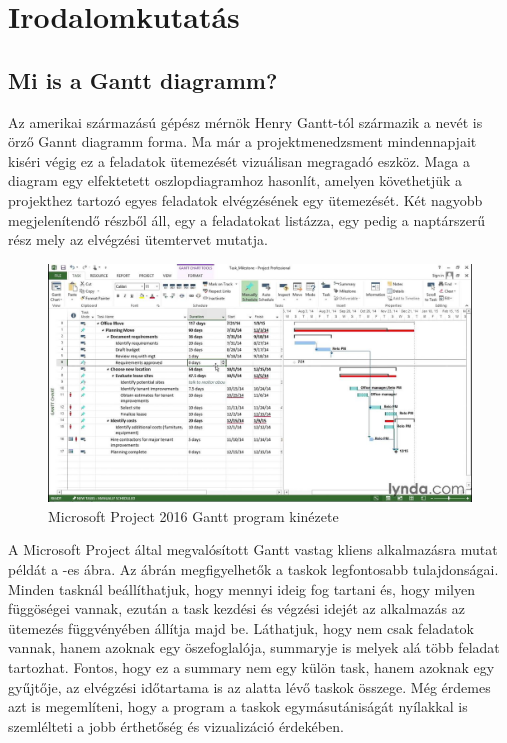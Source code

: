 \chapter{Irodalomkutatás}\label{sect:Literature}
\section{Mi is a Gantt diagramm?}

\hspace{2mm} Az amerikai származású gépész mérnök Henry Gantt-tól származik a nevét is örző Gannt diagramm forma. Ma már a projektmenedzsment mindennapjait kiséri végig ez a feladatok ütemezését vizuálisan megragadó eszköz. Maga a diagram egy elfektetett oszlopdiagramhoz hasonlít, amelyen követhetjük a projekthez tartozó egyes feladatok elvégzésének egy ütemezését.  Két nagyobb megjelenítendő részből áll, egy a feladatokat listázza, egy pedig a naptárszerű rész mely az elvégzési ütemtervet mutatja. 

\begin{figure}[!ht]
\centering
\includegraphics[width=\textwidth, keepaspectratio]{figures/msproject.jpg}
\caption{Microsoft Project 2016 Gantt program kinézete} 
\label{fig:MSProject}
\end{figure} 

A Microsoft Project által megvalósított Gantt vastag kliens alkalmazásra mutat példát a -es ábra. Az ábrán megfigyelhetők a taskok legfontosabb tulajdonságai. Minden tasknál beállíthatjuk, hogy mennyi ideig fog tartani és, hogy milyen függöségei vannak, ezután a task kezdési és végzési idejét az alkalmazás az ütemezés függvényében állítja majd be. Láthatjuk, hogy nem csak feladatok vannak, hanem azoknak egy öszefoglalója, summaryje is melyek alá több feladat tartozhat. Fontos, hogy ez a summary nem egy külön task, hanem azoknak egy gyűjtője, az elvégzési időtartama is az alatta lévő taskok összege. Még érdemes azt is megemlíteni, hogy a program a taskok egymásutániságát nyílakkal is szemlélteti a jobb érthetőség és vizualizáció érdekében. 

